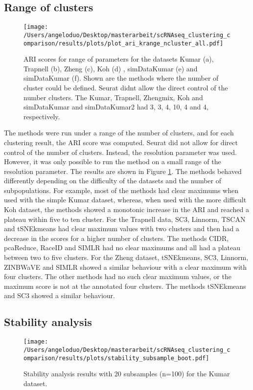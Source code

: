 \documentclass[12pt, a4paper]{article}\usepackage[]{graphicx}\usepackage[]{color}
\begin{document}
\newpage
\subsection{Range of clusters}
\begin{figure}[H]
\centering
\texttt{[image: /Users/angeloduo/Desktop/masterarbeit/scRNAseq\_clustering\_comparison/results/plots/plot\_ari\_krange\_ncluster\_all.pdf]}
\caption{ARI scores for range of parameters for the datasets Kumar (a), Trapnell (b), Zheng (c), Koh (d) , simDataKumar (e) and simDataKumar (f). Shown are the methods where the number of cluster could be defined. Seurat didnt allow the direct control of the number clusters. The Kumar, Trapnell, Zhengmix, Koh and simDataKumar and simDataKumar2 had 3, 3, 4, 10, 4 and 4, respectively.}
\label{fig:arirangeall}
\end{figure}
The methods were run under a range of the number of clusters, and for each clustering result, the ARI score was computed. Seurat did not allow for direct control of the number of clusters. Instead, the resolution parameter was used. However, it was only possible to run the method on a small range of the resolution parameter. The results are shown in Figure \ref{fig:arirangeall}. The methods behaved differently depending on the difficulty of the datasets and the number of subpopulations. For example, most of the methods had clear maximums when used with the simple Kumar dataset, whereas, when used with the more difficult Koh dataset, the methods showed a monotonic increase in the ARI and reached a plateau within five to ten cluster. For the Trapnell data, SC3, Linnorm, TSCAN and tSNEkmeans had clear maximum values with two clusters and then had a decrease in the scores for a higher number of clusters. The methods CIDR, pcaReduce, RaceID and SIMLR had no clear maximums and all had a plateau between two to five clusters. For the Zheng dataset, tSNEkmeans, SC3, Linnorm, ZINBWaVE and SIMLR showed a similar behaviour with a clear maximum with four clusters. The other methods had no such clear maximum values, or the maximum score is not at the annotated four clusters. The methods tSNEkmeans and SC3 showed a similar behaviour.


\subsection{Stability  analysis}
\begin{figure}[H]
\centering
\texttt{[image: /Users/angeloduo/Desktop/masterarbeit/scRNAseq\_clustering\_comparison/results/plots/stability\_subsample\_boot.pdf]}
\caption{Stability analysis results with 20 subsamples (n=100) for the Kumar dataset.}
\label{fig:stab}
\end{figure}
\end{document}

